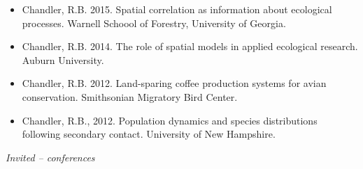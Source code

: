\begin{itemize}
\item Chandler, R.B. 2015. Spatial correlation as information about
  ecological processes. Warnell Schoool of Forestry, University of
  Georgia. 

\item Chandler, R.B. 2014. The role of spatial models in applied
  ecological research. Auburn University.

\item Chandler, R.B. 2012. Land-sparing coffee production systems for avian
  conservation. Smithsonian Migratory Bird Center. 

\item Chandler, R.B., 2012. Population dynamics and species distributions following
  secondary contact. University of New Hampshire.

\end{itemize}

\emph{Invited -- conferences}

